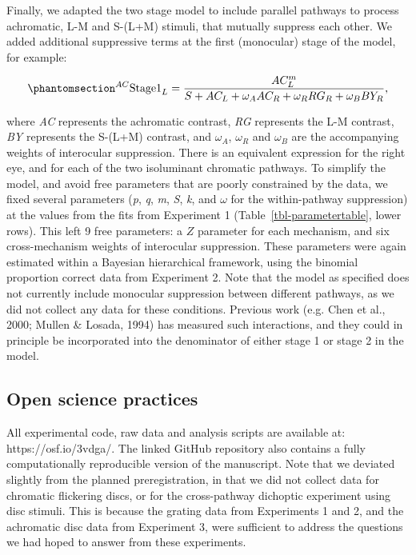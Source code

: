 \documentclass[
  letterpaper,
  DIV=11,
  numbers=noendperiod]{scrartcl}
\begin{document}
Finally, we adapted the two stage model to include parallel pathways to
process achromatic, L-M and S-(L+M) stimuli, that mutually suppress each
other. We added additional suppressive terms at the first (monocular)
stage of the model, for example:

\begin{equation}\phantomsection\label{eq-s1multi}{^{AC}\mathrm{Stage1}_L = \frac{AC_L^m}{S + AC_L + \omega_A AC_R + \omega_R RG_R + \omega_B BY_R},}\end{equation}

where \emph{AC} represents the achromatic contrast, \emph{RG} represents
the L-M contrast, \emph{BY} represents the S-(L+M) contrast, and
\(\omega_A\), \(\omega_R\) and \(\omega_B\) are the accompanying weights
of interocular suppression. There is an equivalent expression for the
right eye, and for each of the two isoluminant chromatic pathways. To
simplify the model, and avoid free parameters that are poorly
constrained by the data, we fixed several parameters (\emph{p},
\emph{q}, \emph{m}, \emph{S}, \emph{k}, and \(\omega\) for the
within-pathway suppression) at the values from the fits from Experiment
1 (Table~\ref{tbl-parametertable}, lower rows). This left 9 free
parameters: a \(Z\) parameter for each mechanism, and six
cross-mechanism weights of interocular suppression. These parameters
were again estimated within a Bayesian hierarchical framework, using the
binomial proportion correct data from Experiment 2. Note that the model
as specified does not currently include monocular suppression between
different pathways, as we did not collect any data for these conditions.
Previous work (e.g. Chen et al., 2000; Mullen \& Losada, 1994) has
measured such interactions, and they could in principle be incorporated
into the denominator of either stage 1 or stage 2 in the model.

\subsection{Open science practices}\label{open-science-practices}

All experimental code, raw data and analysis scripts are available at:
https://osf.io/3vdga/. The linked GitHub repository also contains a
fully computationally reproducible version of the manuscript. Note that
we deviated slightly from the planned preregistration, in that we did
not collect data for chromatic flickering discs, or for the
cross-pathway dichoptic experiment using disc stimuli. This is because
the grating data from Experiments 1 and 2, and the achromatic disc data
from Experiment 3, were sufficient to address the questions we had hoped
to answer from these experiments.
\end{document}
